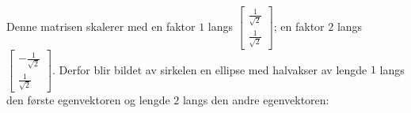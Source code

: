 \documentclass[notitlepage,a4paper,12pt,norsk]{IMFeksamen}
\newcommand{\vv}[2]{\begin{bmatrix} #1 \\ #2 \end{bmatrix}}
\newcommand{\0}{\V{0}}
\newcommand{\oppgslutt}{
\begin{center}
\pgfornament[width=6cm]{88}
\end{center}
}
\newenvironment{losning}{\begin{oppgave}}{\oppgslutt\end{oppgave}}
\begin{document}
\begin{losning}
Denne matrisen skalerer med en faktor $1$ langs $\vv{\frac{1}{\sqrt{2}}}{\frac{1}{\sqrt{2}}}$; en faktor $2$ langs $\vv{-\frac{1}{\sqrt{2}}}{\frac{1}{\sqrt{2}}}$. Derfor blir bildet av sirkelen en ellipse med halvakser av lengde $1$ langs den første egenvektoren og lengde $2$ langs den andre egenvektoren:

\begin{center}
\end{center}





\end{losning}
\end{document}
